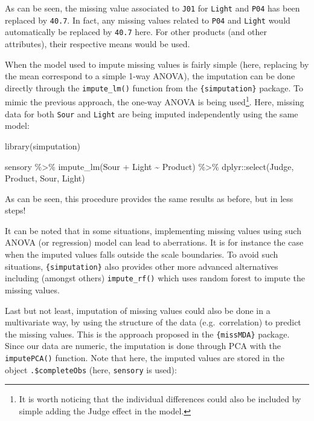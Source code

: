 \documentclass[
]{book}
\newenvironment{Shaded}{\begin{snugshade}}{\end{snugshade}}
\newcommand{\FunctionTok}[1]{\textcolor[rgb]{0.00,0.00,0.00}{#1}}
\newcommand{\NormalTok}[1]{#1}
\newcommand{\SpecialCharTok}[1]{\textcolor[rgb]{0.00,0.00,0.00}{#1}}
\begin{document}
As can be seen, the missing value associated to \texttt{J01} for \texttt{Light} and \texttt{P04} has been replaced by \texttt{40.7}. In fact, any missing values related to \texttt{P04} and \texttt{Light} would automatically be replaced by \texttt{40.7} here. For other products (and other attributes), their respective means would be used.

When the model used to impute missing values is fairly simple (here, replacing by the mean correspond to a simple 1-way ANOVA), the imputation can be done directly through the \texttt{impute\_lm()} function from the \texttt{\{simputation\}} package. To mimic the previous approach, the one-way ANOVA is being used\footnote{It is worth noticing that the individual differences could also be included by simple adding the Judge effect in the model.}. Here, missing data for both \texttt{Sour} and \texttt{Light} are being imputed independently using the same model:

\begin{Shaded}
\begin{Highlighting}[]
\FunctionTok{library}\NormalTok{(simputation)}

\NormalTok{sensory }\SpecialCharTok{\%\textgreater{}\%} 
  \FunctionTok{impute\_lm}\NormalTok{(Sour }\SpecialCharTok{+}\NormalTok{ Light }\SpecialCharTok{\textasciitilde{}}\NormalTok{ Product) }\SpecialCharTok{\%\textgreater{}\%} 
\NormalTok{  dplyr}\SpecialCharTok{::}\FunctionTok{select}\NormalTok{(Judge, Product, Sour, Light)}
\end{Highlighting}
\end{Shaded}

As can be seen, this procedure provides the same results as before, but in less steps!

It can be noted that in some situations, implementing missing values using such ANOVA (or regression) model can lead to aberrations. It is for instance the case when the imputed values falls outside the scale boundaries. To avoid such situations, \texttt{\{simputation\}} also provides other more advanced alternatives including (amongst others) \texttt{impute\_rf()} which uses random forest to impute the missing values.

Last but not least, imputation of missing values could also be done in a multivariate way, by using the structure of the data (e.g.~correlation) to predict the missing values. This is the approach proposed in the \texttt{\{missMDA\}} package. Since our data are numeric, the imputation is done through PCA with the \texttt{imputePCA()} function. Note that here, the imputed values are stored in the object \texttt{.\$completeObs} (here, \texttt{sensory} is used):
\end{document}
